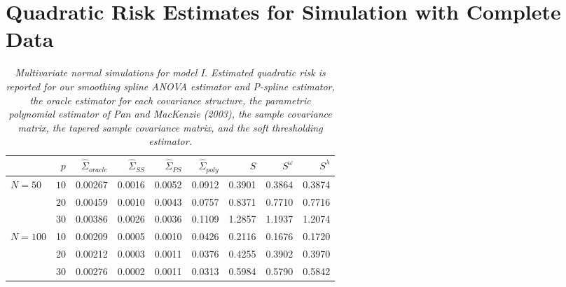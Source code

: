 \section{Quadratic Risk Estimates for Simulation with Complete Data}
%
\begin{table}[H]
\centering
\caption{\textit{Multivariate normal simulations for model I. Estimated quadratic risk is reported for our smoothing spline ANOVA estimator and P-spline estimator, the oracle estimator for each covariance structure, the parametric polynomial estimator of Pan and MacKenzie (2003), the sample covariance matrix, the tapered sample covariance matrix,
                                    and the soft thresholding estimator.}}
\begin{tabular}{lrrrrrrrr}
& $p$ &$\hat{\Sigma}_{oracle}$&  $\hat{\Sigma}_{SS}$& $\hat{\Sigma}_{PS}$ &$\hat{\Sigma}_{poly}$ & $S$ &$S^\omega$& $S^\lambda$ \\ 
  \hline
  $N = 50$ & $10$ &0.00267 & 0.0016 & 0.0052 &  0.0912 & 0.3901 & 0.3864 & 0.3874 \\ 
   		& $20$ &0.00459 & 0.0010 & 0.0043 &  0.0757 & 0.8371 & 0.7710 & 0.7716 \\ 
   		& $30$ & 0.00386 & 0.0026 & 0.0036 &  0.1109 & 1.2857 & 1.1937 & 1.2074 \\ 
 $N = 100$ & 10 &  0.00209 & 0.0005 & 0.0010 &0.0426 & 0.2116 & 0.1676 & 0.1720 \\ 
    		&   $20$ &  0.00212 &0.0003 & 0.0011 & 0.0376 & 0.4255 & 0.3902 & 0.3970 \\ 
    		&   $30$ &0.00276 & 0.0002 & 0.0011 &  0.0313 & 0.5984 & 0.5790 & 0.5842 \\ 
   \hline
\end{tabular} 
\label{table:simulation-1-quad-loss-sigma-1}
\end{table}
